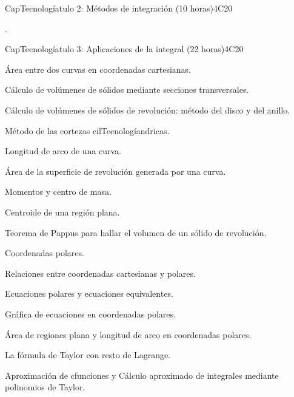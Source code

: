 \begin{syllabus}
\begin{unit}{CapTecnologíatulo 2: Métodos de integración (10 horas)}{}{}{4}{C20}
\begin{learningoutcomes}
      \item .
\end{learningoutcomes}
\end{unit}

\begin{unit}{CapTecnologíatulo 3: Aplicaciones de la integral (22 horas)}{}{}{4}{C20}


\begin{topics}
      \item Área entre dos curvas en coordenadas cartesianas. 
      \item Cálculo de volúmenes de sólidos mediante secciones transversales. 
      \item Cálculo de volúmenes de sólidos de revolución: método del disco y del anillo.
      \item Método de las cortezas cilTecnologíandricas.
      \item Longitud de arco de una curva. 
      \item Área de la superficie de revolución generada por una curva. 
      \item Momentos y centro de masa. 
      \item Centroide de una región plana. 
      \item Teorema de Pappus para hallar el volumen de un sólido de revolución.
      \item Coordenadas polares. 
      \item Relaciones entre coordenadas cartesianas y polares. 
      \item Ecuaciones polares y ecuaciones equivalentes. 
      \item Gráfica de ecuaciones en coordenadas polares.
      \item Área de regiones plana y longitud de arco en coordenadas polares. 
      \item La fórmula de Taylor con resto de Lagrange. 
      \item Aproximación de cfunciones y Cálculo aproximado de integrales mediante polinomios de 				Taylor.
\end{topics}


\end{unit}
\end{syllabus}
